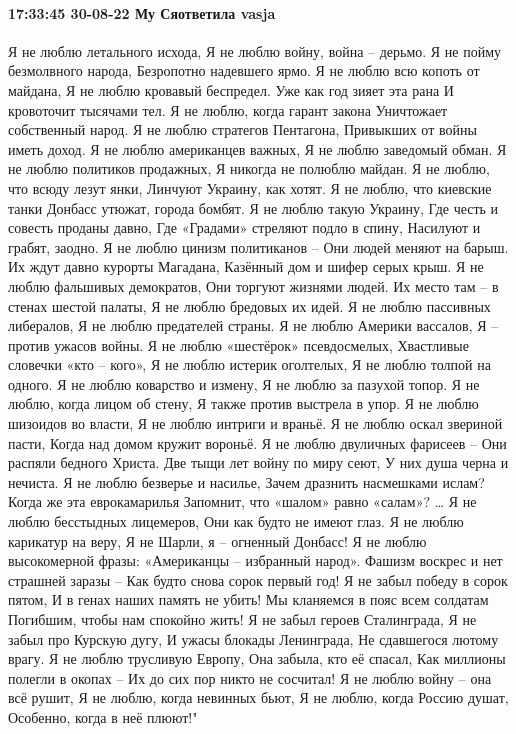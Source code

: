  
 
 
 
 

\paragraph{17:33:45 30-08-22 Му Сяответила vasja}

Я не люблю летального исхода,
Я не люблю войну, война – дерьмо.
Я не пойму безмолвного народа,
Безропотно надевшего ярмо.
Я не люблю всю копоть от майдана,
Я не люблю кровавый беспредел.
Уже как год зияет эта рана
И кровоточит тысячами тел.
Я не люблю, когда гарант закона
Уничтожает собственный народ.
Я не люблю стратегов Пентагона,
Привыкших от войны иметь доход.
Я не люблю американцев важных,
Я не люблю заведомый обман.
Я не люблю политиков продажных,
Я никогда не полюблю майдан.
Я не люблю, что всюду лезут янки,
Линчуют Украину, как хотят.
Я не люблю, что киевские танки
Донбасс утюжат, города бомбят.
Я не люблю такую Украину,
Где честь и совесть проданы давно,
Где «Градами» стреляют подло в спину,
Насилуют и грабят, заодно.
Я не люблю цинизм политиканов –
Они людей меняют на барыш.
Их ждут давно курорты Магадана,
Казённый дом и шифер серых крыш.
Я не люблю фальшивых демократов,
Они торгуют жизнями людей.
Их место там – в стенах шестой палаты,
Я не люблю бредовых их идей.
Я не люблю пассивных либералов,
Я не люблю предателей страны.
Я не люблю Америки вассалов,
Я – против ужасов войны.
Я не люблю «шестёрок» псевдосмелых,
Хвастливые словечки «кто – кого»,
Я не люблю истерик оголтелых,
Я не люблю толпой на одного.
Я не люблю коварство и измену,
Я не люблю за пазухой топор.
Я не люблю, когда лицом об стену,
Я также против выстрела в упор.
Я не люблю шизоидов во власти,
Я не люблю интриги и враньё.
Я не люблю оскал звериной пасти,
Когда над домом кружит вороньё.
Я не люблю двуличных фарисеев –
Они распяли бедного Христа.
Две тыщи лет войну по миру сеют,
У них душа черна и нечиста.
Я не люблю безверье и насилье,
Зачем дразнить насмешками ислам?
Когда же эта еврокамарилья
Запомнит, что «шалом» равно «салам»? …
Я не люблю бесстыдных лицемеров,
Они как будто не имеют глаз.
Я не люблю карикатур на веру,
Я не Шарли, я – огненный Донбасс!
Я не люблю высокомерной фразы:
«Американцы – избранный народ».
Фашизм воскрес и нет страшней заразы –
Как будто снова сорок первый год!
Я не забыл победу в сорок пятом,
И в генах наших память не убить!
Мы кланяемся в пояс всем солдатам
Погибшим, чтобы нам спокойно жить!
Я не забыл героев Сталинграда,
Я не забыл про Курскую дугу,
И ужасы блокады Ленинграда,
Не сдавшегося лютому врагу.
Я не люблю трусливую Европу,
Она забыла, кто её спасал,
Как миллионы полегли в окопах –
Их до сих пор никто не сосчитал!
Я не люблю войну – она всё рушит,
Я не люблю, когда невинных бьют,
Я не люблю, когда Россию душат,
Особенно, когда в неё плюют!"


